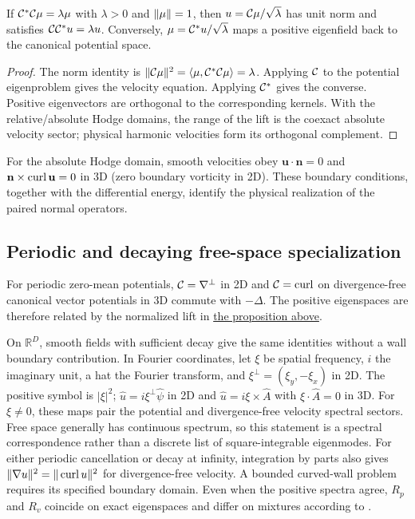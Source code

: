 \begin{proposition}
\label{prop:positive-spectrum}
If $\mathcal C^*\mathcal C\mu=\lambda\mu$ with $\lambda>0$ and $\lVert \mu\rVert=1$, then $u=\mathcal C\mu/\sqrt\lambda$ has unit norm and satisfies $\mathcal C\mathcal C^*u=\lambda u$. Conversely, $\mu=\mathcal C^*u/\sqrt\lambda$ maps a positive eigenfield back to the canonical potential space.
\end{proposition}
\begin{proof}
The norm identity is $\lVert \mathcal C\mu\rVert^2=\langle \mu,\mathcal C^*\mathcal C\mu\rangle=\lambda$. Applying $\mathcal C$ to the potential eigenproblem gives the velocity equation. Applying $\mathcal C^*$ gives the converse. Positive eigenvectors are orthogonal to the corresponding kernels. With the relative/absolute Hodge domains, the range of the lift is the coexact absolute velocity sector; physical harmonic velocities form its orthogonal complement.
\end{proof}

For the absolute Hodge domain, smooth velocities obey $\mathbf u\cdot\mathbf n=0$ and $\mathbf n\times\operatorname{curl}\mathbf u=0$ in 3D (zero boundary vorticity in 2D). These boundary conditions, together with the differential energy, identify the physical realization of the paired normal operators.

\begingroup
\subsection{Periodic and decaying free-space specialization}
For periodic zero-mean potentials, $\mathcal C=\nabla^\perp$ in 2D and $\mathcal C=\operatorname{curl}$ on divergence-free canonical vector potentials in 3D commute with $-\Delta$. The positive eigenspaces are therefore related by the normalized lift in \hyperref[prop:positive-spectrum]{the proposition above}.

On $\mathbb R^D$, smooth fields with sufficient decay give the same identities without a wall boundary contribution. In Fourier coordinates, let $\xi$ be spatial frequency, $i$ the imaginary unit, a hat the Fourier transform, and $\xi^\perp=(\xi_y,-\xi_x)$ in 2D. The positive symbol is $|\xi|^2$; $\widehat{u}=i\xi^\perp\widehat\psi$ in 2D and $\widehat{u}=i\xi\times\widehat A$ with $\xi\cdot\widehat A=0$ in 3D. For $\xi\ne0$, these maps pair the potential and divergence-free velocity spectral sectors. Free space generally has continuous spectrum, so this statement is a spectral correspondence rather than a discrete list of square-integrable eigenmodes. For either periodic cancellation or decay at infinity, integration by parts also gives $\|\nabla u\|^2=\|\operatorname{curl} u\|^2$ for divergence-free velocity. A bounded curved-wall problem requires its specified boundary domain. Even when the positive spectra agree, $R_p$ and $R_v$ coincide on exact eigenspaces and differ on mixtures according to .
\par\endgroup

